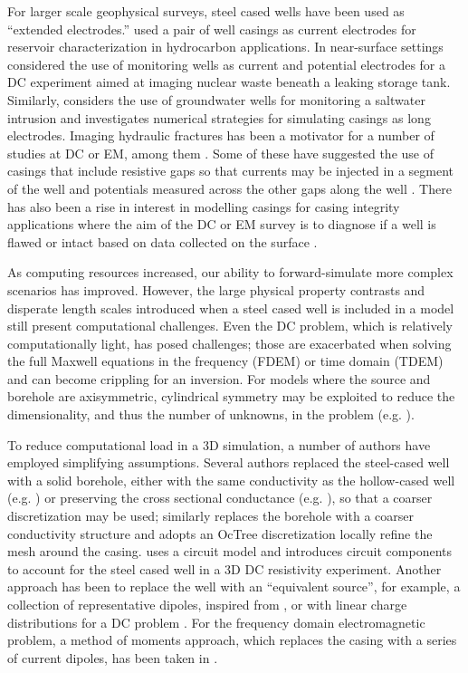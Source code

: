 For larger scale geophysical surveys, steel cased wells have been used as ``extended electrodes.'' \cite{Rocroi1985} used a pair of well casings as current electrodes for reservoir characterization in hydrocarbon applications. In near-surface settings \citep{Ramirez1996, Rucker2010, Rucker2012} considered the use of monitoring wells as current and potential electrodes for a DC experiment aimed at imaging nuclear waste beneath a leaking storage tank. Similarly, \cite{Ronczka2015} considers the use of groundwater wells for monitoring a saltwater intrusion and investigates numerical strategies for simulating casings as long electrodes. Imaging hydraulic fractures has been a motivator for a number of studies at DC or EM, among them \cite{Weiss2016, hoversten2017borehole}. Some of these have suggested the use of casings that include resistive gaps so that currents may be injected in a segment of the well and potentials measured across the other gaps along the well \citep{Nekut1995, Zhang2018}. There has also been a rise in interest in modelling casings for casing integrity applications where the aim of the DC or EM survey is to diagnose if a well is flawed or intact based on data collected on the surface \citep{Wilt2018}.

As computing resources increased, our ability to forward-simulate more complex scenarios has improved. However, the large physical property contrasts and disperate length scales introduced when a steel cased well is included in a model still present computational challenges. Even the DC problem, which is relatively computationally light, has posed challenges; those are exacerbated when solving the full Maxwell equations in the frequency (FDEM) or time domain (TDEM) and can become crippling for an inversion. For models where the source and borehole are axisymmetric, cylindrical symmetry may be exploited to reduce the dimensionality, and thus the number of unknowns, in the problem (e.g. \cite{Pardo2013, Heagy2015}).

To reduce computational load in a 3D simulation, a number of authors have employed simplifying assumptions. Several authors replaced the steel-cased well with a solid borehole, either with the same conductivity as the hollow-cased well (e.g. \cite{Um2015, Puzyrev2017}) or preserving the cross sectional conductance (e.g. \cite{Swidinsky2013, Kohnke2017}), so that a coarser discretization may be used; \cite{Haber2016} similarly replaces the borehole with a coarser conductivity structure and adopts an OcTree discretization locally refine the mesh around the casing. \cite{Yang2016} uses a circuit model and introduces circuit components to account for the steel cased well in a 3D DC resistivity experiment. Another approach has been to replace the well with an ``equivalent source'', for example, a collection of representative dipoles, inspired from \cite{cuevas2014}, or with linear charge distributions for a DC problem \citep{Weiss2016}. For the frequency domain electromagnetic problem, a method of moments approach, which replaces the casing with a series of current dipoles, has been taken in \cite{Kohnke2017}.

